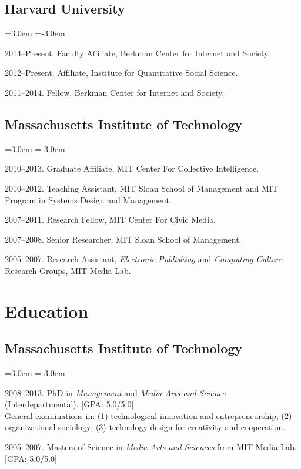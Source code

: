 \documentclass[10pt]{article}
\newenvironment{cvlist}{
\begin{list}{}{\leftmargin=3.0em \itemindent=-3.0em}
  \setlength{\itemsep}{0pt}
  \setlength{\parskip}{0em}
  \setlength{\parsep}{1em}
  \setlength{\parindent}{0em}}
{\vspace{1em}
\end{list}}
\begin{document}
\subsection{Harvard University}
\begin{cvlist}
\item 2014--Present. Faculty Affiliate, Berkman Center for Internet and Society.
\item 2012--Present. Affiliate, Institute for Quantitative Social Science.
\item 2011--2014. Fellow, Berkman Center for Internet and Society.
\end{cvlist}

\subsection{Massachusetts Institute of Technology}
\begin{cvlist}
\item 2010--2013. Graduate Affiliate, MIT Center For Collective Intelligence.
\item 2010--2012. Teaching Assistant, MIT Sloan School of Management and MIT Program in Systems Design and Management.
\item 2007--2011. Research Fellow, MIT Center For Civic Media.
\item 2007--2008. Senior Researcher, MIT Sloan School of Management.
\item 2005--2007. Research Assistant, \emph{Electronic Publishing} and \emph{Computing Culture} Research Groups, MIT Media Lab.
\end{cvlist}

\section{Education}

\subsection{Massachusetts Institute of Technology}
\begin{cvlist}

\item 2008--2013. PhD in \emph{Management} and \emph{Media
    Arts and Science} (Interdepartmental).
  [GPA: 5.0/5.0] \\
  General examinations in: (1) technological innovation and entrepreneurship; (2) organizational sociology; (3) technology design for creativity and cooperation.

\item 2005--2007. Masters of Science in \emph{Media Arts and
    Sciences} from MIT Media Lab. [GPA: 5.0/5.0]

\end{cvlist}
\end{document}
